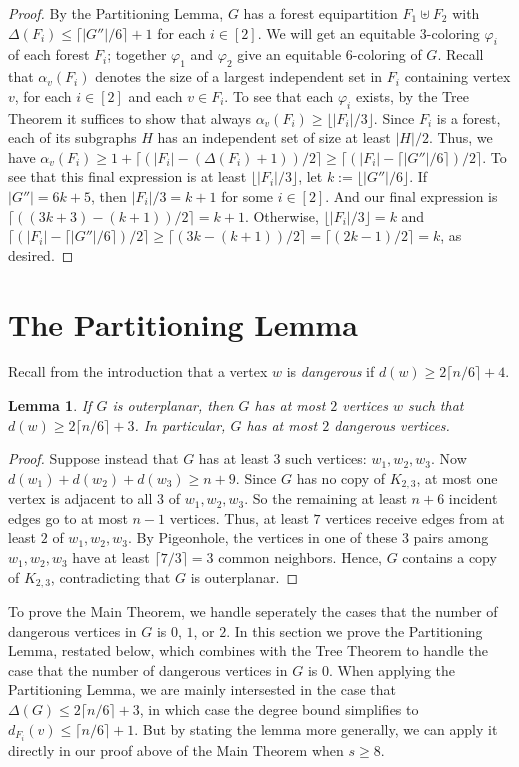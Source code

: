 \documentclass[11pt]{article}
\newtheorem{lem}{Lemma}
\theoremstyle{definition}
\newcommand\floor[1]{\lfloor#1\rfloor}
\newcommand\ceil[1]{\lceil#1\rceil}
\renewcommand\ge\geqslant
\renewcommand\le\leqslant
\newcommand\vph\varphi
\begin{document}
\begin{proof}
	By the Partitioning Lemma, $G$ has a forest equipartition $F_1\uplus F_2$ with $\Delta(F_i)\le \ceil{|G''|/6}+1$ for each $i\in [2]$.
	We will get an equitable $3$-coloring $\vph_i$ of each forest $F_i$; together $\vph_1$ and $\vph_2$ give an equitable $6$-coloring of $G$.
	Recall that $\alpha_v(F_i)$ denotes the size of a largest independent set in $F_i$ containing vertex $v$, for each $i\in[2]$ and each $v\in F_i$.
	To see that each $\vph_i$ exists, by the Tree Theorem it suffices to show that always $\alpha_v(F_i)\ge \floor{|F_i|/3}$.  Since $F_i$ is a forest,
	each of its subgraphs $H$ has an independent set of size at least $|H|/2$.
	Thus, we have $\alpha_v(F_i)\ge 1+\ceil{(|F_i| - (\Delta(F_i)+1))/2} \ge \ceil{(|F_i|-\ceil{|G''|/6})/2}$.
	To see that this final expression is at least $\floor{|F_i|/3}$, 
	let $k:=\floor{|G''|/6}$.  If $|G''| = 6k+5$, then $|F_i|/3 = k+1$ for some $i\in[2]$.  And our final expression is 
	$\ceil{((3k+3)-(k+1))/2} = k+1$.  Otherwise, $\floor{|F_i|/3} = k$ and $\ceil{(|F_i|-\ceil{|G''|/6})/2} \ge \ceil{(3k-(k+1))/2} = \ceil{(2k-1)/2}=k$, 
	as desired.
\end{proof}


\section{The Partitioning Lemma}
\label{partitioning-sec}
Recall from the introduction that a vertex $w$ is \emph{dangerous} if $d(w)\ge 2\lceil n/6\rceil + 4$.

\begin{lem}
	If $G$ is outerplanar, then $G$ has at most $2$ vertices $w$ such that $d(w)\ge 2\lceil n/6\rceil + 3$.
	In particular, $G$ has at most $2$ dangerous vertices.
	\label{few-big-lem}
\end{lem}
\begin{proof}
	Suppose instead that $G$ has at least $3$ such vertices: $w_1, w_2, w_3$.  Now $d(w_1)+d(w_2)+d(w_3) \ge n+9$.
	Since $G$ has no copy of $K_{2,3}$, at most one vertex is adjacent to all $3$ of $w_1,w_2,w_3$.  
	So the remaining at least $n+6$ incident edges go to at most $n-1$ vertices.
	Thus, at least $7$ vertices receive edges from at least $2$ of $w_1,w_2,w_3$.  By Pigeonhole, the vertices in one of these $3$ pairs 
	among $w_1,w_2,w_3$ have at least $\lceil 7/3\rceil = 3$ common neighbors.  Hence, $G$ contains a copy of $K_{2,3}$, contradicting that $G$ 
	is outerplanar.
\end{proof}

To prove the Main Theorem, we handle seperately the cases that the number of dangerous vertices in $G$ is $0$, $1$, or $2$.
In this section we prove the Partitioning Lemma, restated below, which combines with the Tree Theorem to handle the case that
the number of dangerous vertices in $G$ is $0$.  When applying the Partitioning Lemma, we are mainly intersested in the case that 
$\Delta(G)\le 2\ceil{n/6}+3$, in which case the degree bound simplifies to $d_{F_i}(v)\le \ceil{n/6}+1$.  But by stating the lemma 
more generally, we can apply it directly in our proof above of the Main Theorem when $s\ge 8$.
\end{document}
